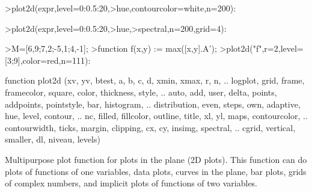 \documentclass{article}
\begin{document}
\begin{eulernotebook}
\begin{eulercomment}
\begin{eulercomment}
\begin{eulercomment}
\begin{eulercomment}
\begin{eulerprompt}
>plot2d(expr,level=0:0.5:20,>hue,contourcolor=white,n=200):
\end{eulerprompt}
\begin{eulerprompt}
>plot2d(expr,level=0:0.5:20,>hue,>spectral,n=200,grid=4):
\end{eulerprompt}
\begin{eulerprompt}
>M=[6,9;7,2;-5,1;4,-1];
>function f(x,y) := max([x,y].A');
>plot2d("f",r=2,level=[3;9],color=red,n=111):
\end{eulerprompt}
\begin{eulercomment}
\end{eulercomment}
\begin{eulerttcomment}
  function plot2d (xv, yv, btest, a, b, c, d, xmin, xmax, r, n,  ..
  logplot, grid, frame, framecolor, square, color, thickness, style, ..
  auto, add, user, delta, points, addpoints, pointstyle, bar, histogram,  ..
  distribution, even, steps, own, adaptive, hue, level, contour,  ..
  nc, filled, fillcolor, outline, title, xl, yl, maps, contourcolor, ..
  contourwidth, ticks, margin, clipping, cx, cy, insimg, spectral,  ..
  cgrid, vertical, smaller, dl, niveau, levels)
\end{eulerttcomment}
\begin{eulercomment}
Multipurpose plot function for plots in the plane (2D plots). This function can do
plots of functions of one variables, data plots, curves in the plane, bar plots, grids
of complex numbers, and implicit plots of functions of two variables.


\end{eulercomment}
\end{eulercomment}
\end{eulercomment}
\end{eulercomment}
\end{eulercomment}
\end{eulernotebook}
\end{document}
